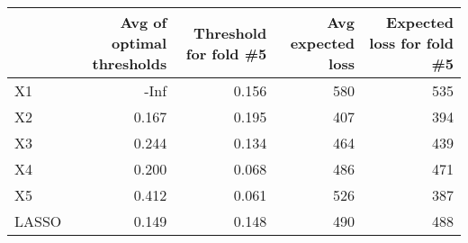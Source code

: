 
\begin{tabular}{lrrrr}
\toprule
  & Avg of optimal thresholds & Threshold for fold \#5 & Avg expected loss & Expected loss for fold \#5\\
\midrule
X1 & -Inf & 0.156 & 580 & 535\\
X2 & 0.167 & 0.195 & 407 & 394\\
X3 & 0.244 & 0.134 & 464 & 439\\
X4 & 0.200 & 0.068 & 486 & 471\\
X5 & 0.412 & 0.061 & 526 & 387\\
LASSO & 0.149 & 0.148 & 490 & 488\\
\bottomrule
\end{tabular}